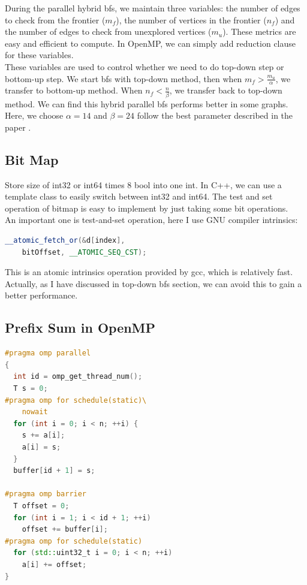 \documentclass[10pt,twocolumn,letterpaper]{article}
\begin{document}
During the parallel hybrid bfs, we maintain three variables: the number of edges to check from the frontier ($m_f$), the number of vertices in the frontier ($n_f$) and the number of edges to check from unexplored vertices ($m_u$). These metrics are easy and efficient to compute. In OpenMP, we can simply add reduction clause for these variables.\\
These variables are used to control whether we need to do top-down step or bottom-up step. We start bfs with top-down method, then when $m_f > \frac{m_u}{\alpha}$, we transfer to bottom-up method. When $n_f < \frac{n}{\beta}$, we transfer back to top-down method. We can find this hybrid parallel bfs performs better in some graphs.\\
Here, we choose $\alpha = 14$ and $\beta = 24$ follow the best parameter described in the paper \cite{beamer2012direction}.\\

\subsection{Bit Map}

Store size of int32 or int64 times 8 bool into one int. In C++, we can use a template class to easily switch between int32 and int64. The test and set operation of bitmap is easy to implement by just taking some bit operations.\\
An important one is test-and-set operation, here I use GNU compiler intrinsics:
\begin{lstlisting}[language=C++]
__atomic_fetch_or(&d[index], 
    bitOffset, __ATOMIC_SEQ_CST);
\end{lstlisting}
This is an atomic intrinsics operation provided by gcc, which is relatively fast. Actually, as I have discussed in top-down bfs section, we can avoid this to gain a better performance.

\subsection{Prefix Sum in OpenMP}

\begin{lstlisting}[language=C++]
#pragma omp parallel
{
  int id = omp_get_thread_num();
  T s = 0;
#pragma omp for schedule(static)\
    nowait
  for (int i = 0; i < n; ++i) {
    s += a[i];
    a[i] = s;
  }
  buffer[id + 1] = s;

#pragma omp barrier
  T offset = 0;
  for (int i = 1; i < id + 1; ++i) 
    offset += buffer[i];
#pragma omp for schedule(static)
  for (std::uint32_t i = 0; i < n; ++i) 
    a[i] += offset;
}
\end{lstlisting}
\end{document}

